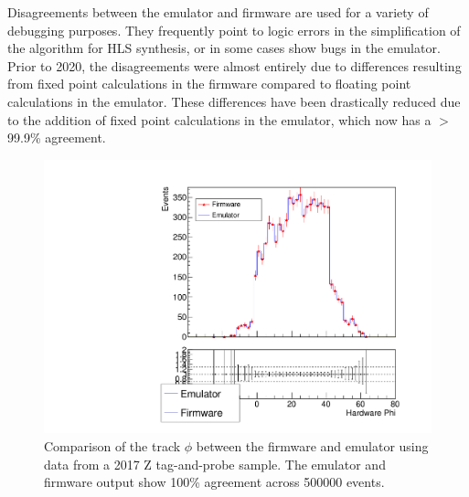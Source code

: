 Disagreements between the emulator and firmware are used for a variety of debugging purposes. They frequently point to logic errors in the simplification of the algorithm for HLS synthesis, or in some cases show bugs in the emulator. Prior to 2020, the disagreements were almost entirely due to differences resulting from fixed point calculations in the firmware compared to floating point calculations in the emulator. These differences have been drastically reduced due to the addition of fixed point calculations in the emulator, which now has a $>$99.9\% agreement.

\begin{figure} [htb!]
	\centering
	\includegraphics[width=0.75\linewidth]{figs/04_muons/fwVsEmu_phi.pdf}
	\caption[Comparison of the track $\phi$ between the firmware and emulator using data from a 2017 Z tag-and-probe sample. The emulator and firmware output show 100\% agreement across 500000 events.]{Comparison of the track $\phi$ between the firmware and emulator using data from a 2017 Z tag-and-probe sample. The emulator and firmware output show 100\% agreement across 500000 events.}
	\label{fig:kmtf_fwVsEmu}
\end{figure}